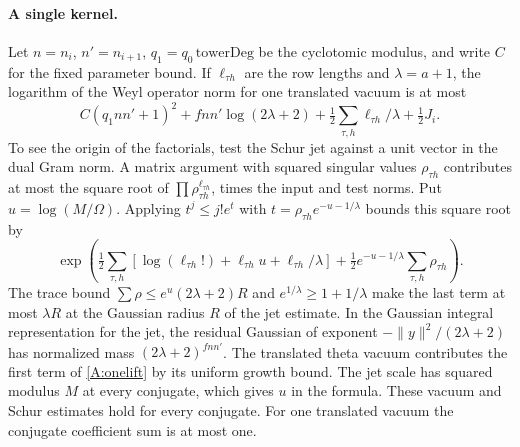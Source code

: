 \paragraph{A single kernel.}\label{A:kernel}
Let $n=n_i$, $n'=n_{i+1}$, $q_1=q_0\,\mathrm{towerDeg}$ be the cyclotomic modulus, and write $C$ for the fixed parameter bound. If $\ell_{\tau h}$ are the row lengths and $\lambda=a+1$, the logarithm of the Weyl operator norm for one translated vacuum is at most
\begin{equation}
 C(q_1nn'+1)^2+fnn'\log(2\lambda+2)
 +\tfrac12\sum_{\tau,h}\ell_{\tau h}/\lambda+\tfrac12 J_i.\label{A:onelift}
\end{equation}
To see the origin of the factorials, test the Schur jet against a unit vector in the dual Gram norm. A matrix argument with squared singular values $\rho_{\tau h}$ contributes at most the square root of $\prod\rho_{\tau h}^{\ell_{\tau h}}$, times the input and test norms. Put $u=\log(M/\Omega)$. Applying $t^j\le j!e^t$ with $t=\rho_{\tau h}e^{-u-1/\lambda}$ bounds this square root by
\[
 \exp\left(\tfrac12\sum_{\tau,h}
 [\log(\ell_{\tau h}!)+\ell_{\tau h}u+\ell_{\tau h}/\lambda]
 +\tfrac12 e^{-u-1/\lambda}\sum_{\tau,h}\rho_{\tau h}\right).
\]
The trace bound $\sum\rho\le e^u(2\lambda+2)R$ and $e^{1/\lambda}\ge1+1/\lambda$ make the last term at most $\lambda R$ at the Gaussian radius $R$ of the jet estimate. In the Gaussian integral representation for the jet, the residual Gaussian of exponent $-\|y\|^2/(2\lambda+2)$ has normalized mass $(2\lambda+2)^{fnn'}$. The translated theta vacuum contributes the first term of \eqref{A:onelift} by its uniform growth bound. The jet scale has squared modulus $M$ at every conjugate, which gives $u$ in the formula. These vacuum and Schur estimates hold for every conjugate. For one translated vacuum the conjugate coefficient sum is at most one.

